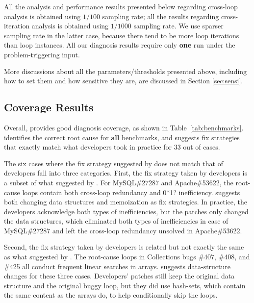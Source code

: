 All the analysis and performance results presented below regarding
cross-loop analysis is obtained using $1/100$ sampling rate; all the
results regarding cross-iteration analysis is obtained using $1/1000$ sampling
rate. We use sparser sampling rate in the latter case, because there tend to
be more loop iterations than loop instances.
All our diagnosis results require only \textbf{one} run under the 
problem-triggering input.

More discussions about all the parameters/thresholds presented above, including
how to set them and how sensitive they are, are discussed in Section
\ref{sec:sensi}. 

\subsection{Coverage Results}
\label{sec:coverage}
Overall, \Tool provides good diagnosis coverage, as shown in Table~\ref{tab:benchmarks}. 
\Tool identifies the correct root cause for \textbf{all} \allbugs benchmarks, and 
suggests fix strategies that exactly match what developers took in practice
for 33 out of \allbugs cases. 

The six cases where the fix strategy suggested by \Tool does not match that of 
developers fall into three categories.
First, the fix strategy taken by developers is a subset of what suggested by 
\Tool.
For MySQL\#27287 and Apache\#53622, the root-cause loops contain both
cross-loop redundancy and 0*1? inefficiency. \Tool suggests both changing
data structures and memoization as fix strategies. In practice, the developers
acknowledge both types of inefficiencies, but the patches
only changed the data structures, which eliminated both types of inefficiencies 
in case of MySQL\#27287 and left the cross-loop redundancy unsolved in
Apache\#53622. 

Second, the fix strategy taken by developers is related but not exactly the same as
what suggested by \Tool.
The root-cause loops in 
Collections bugs \#407, \#408, and \#425 all conduct frequent linear searches in arrays.
\Tool suggests data-structure changes for these three cases. Developers' patches 
still keep the original data structure and the original buggy loop, but they
did use hash-sets, which contain the same content as the arrays do,
to help conditionally skip the loops. 

